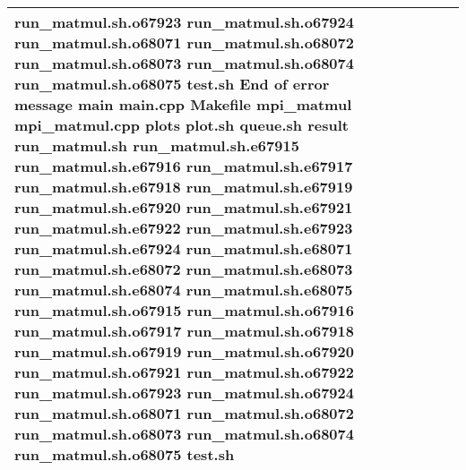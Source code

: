 \documentclass{article}
\begin{document}
\begin{tabular} { | l | l | l | l | l | l | }
run_matmul.sh.o67923 run_matmul.sh.o67924 run_matmul.sh.o68071 run_matmul.sh.o68072 run_matmul.sh.o68073 run_matmul.sh.o68074 run_matmul.sh.o68075 test.sh End of error message main main.cpp Makefile mpi_matmul mpi_matmul.cpp plots plot.sh queue.sh result run_matmul.sh run_matmul.sh.e67915 run_matmul.sh.e67916 run_matmul.sh.e67917 run_matmul.sh.e67918 run_matmul.sh.e67919 run_matmul.sh.e67920 run_matmul.sh.e67921 run_matmul.sh.e67922 run_matmul.sh.e67923 run_matmul.sh.e67924 run_matmul.sh.e68071 run_matmul.sh.e68072 run_matmul.sh.e68073 run_matmul.sh.e68074 run_matmul.sh.e68075 run_matmul.sh.o67915 run_matmul.sh.o67916 run_matmul.sh.o67917 run_matmul.sh.o67918 run_matmul.sh.o67919 run_matmul.sh.o67920 run_matmul.sh.o67921 run_matmul.sh.o67922 run_matmul.sh.o67923 run_matmul.sh.o67924 run_matmul.sh.o68071 run_matmul.sh.o68072 run_matmul.sh.o68073 run_matmul.sh.o68074 run_matmul.sh.o68075 test.sh \\ \hline

\end{tabular}
\end{document}
